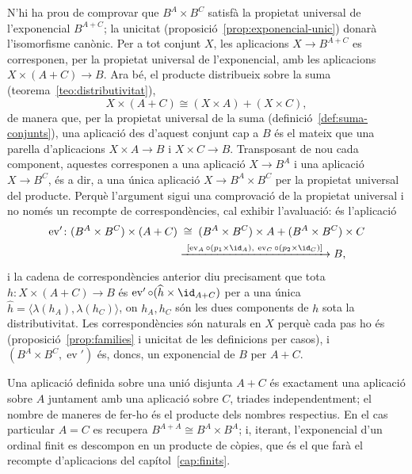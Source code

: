 \begin{prova}
N'hi ha prou de comprovar que \(B^{A}\times B^{C}\) satisfà la propietat
universal de l'exponencial \(B^{A+C}\); la unicitat
(proposició~\ref{prop:exponencial-unic}) donarà l'isomorfisme canònic.
Per a tot conjunt \(X\), les aplicacions \(X\to B^{A+C}\) es corresponen,
per la propietat universal de l'exponencial, amb les aplicacions
\(X\times(A+C)\to B\). Ara bé, el producte distribueix sobre la suma
(teorema~\ref{teo:distributivitat}),
\[
X\times(A+C)\cong(X\times A)+(X\times C),
\]
de manera que, per la propietat universal de la suma
(definició~\ref{def:suma-conjunts}), una aplicació des d'aquest conjunt
cap a \(B\) és el mateix que una parella d'aplicacions \(X\times A\to B\) i
\(X\times C\to B\). Transposant de nou cada component, aquestes
corresponen a una aplicació \(X\to B^{A}\) i una aplicació \(X\to B^{C}\),
és a dir, a una única aplicació \(X\to B^{A}\times B^{C}\) per la propietat
universal del producte. Perquè l'argument sigui una comprovació de la
propietat universal i no només un recompte de correspondències, cal
exhibir l'avaluació: és l'aplicació
\[
\begin{aligned}
\operatorname{ev}'\colon(B^A\times B^C)\times(A+C)
&\;\cong\;(B^A\times B^C)\times A+(B^A\times B^C)\times C\\
&\xrightarrow{\ [\operatorname{ev}_A\circ(p_1\times\id_A),\ \operatorname{ev}_C\circ(p_2\times\id_C)]\ }B,
\end{aligned}
\]
i la cadena de correspondències anterior diu precisament que tota
\(h\colon X\times(A+C)\to B\) és \(\operatorname{ev}'\circ(\widehat h\times\id_{A+C})\)
per a una única \(\widehat h=\langle\lambda(h_A),\lambda(h_C)\rangle\), on
\(h_A,h_C\) són les dues components de \(h\) sota la distributivitat. Les
correspondències són naturals en \(X\) perquè cada pas ho és
(proposició~\ref{prop:families} i unicitat de les definicions per casos), i
\((B^A\times B^C,\operatorname{ev}')\) és, doncs, un exponencial de \(B\) per \(A+C\).
\end{prova}

\begin{observacio}\label{obs:exponencial-suma-classica}
Una aplicació definida sobre una unió disjunta \(A+C\) és exactament una
aplicació sobre \(A\) juntament amb una aplicació sobre \(C\), triades
independentment; el nombre de maneres de fer-ho és el producte dels
nombres respectius. En el cas particular \(A=C\) es recupera
\(B^{A+A}\cong B^{A}\times B^{A}\); i, iterant, l'exponencial d'un ordinal
finit es descompon en un producte de còpies, que és el que farà el
recompte d'aplicacions del capítol~\ref{cap:finits}.
\end{observacio}

